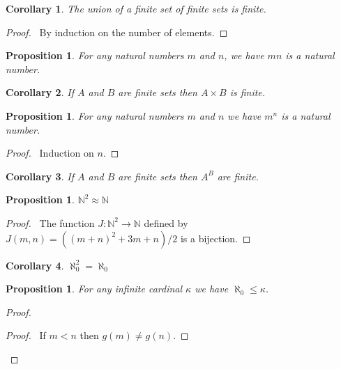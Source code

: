 \documentclass{book}
\let\qed\relax
\newtheorem{prop}[ax]{Proposition}
\newtheorem{cor}{Corollary}[ax]
\theoremstyle{definition}
\begin{document}
\begin{cor}
The union of a finite set of finite sets is finite.
\end{cor}

\begin{proof}
\pf\ By induction on the number of elements. \qed
\end{proof}

\begin{prop}
For any natural numbers $m$ and $n$, we have $mn$ is a natural number.
\end{prop}

\begin{cor}
If $A$ and $B$ are finite sets then $A \times B$ is finite.
\end{cor}

\begin{prop}
For any natural numbers $m$ and $n$ we have $m^n$ is a natural number.
\end{prop}

\begin{proof}
\pf\ Induction on $n$.
\end{proof}

\begin{cor}
If $A$ and $B$ are finite sets then $A^B$ are finite.
\end{cor}

\begin{prop}
$\mathbb{N}^2 \approx \mathbb{N}$
\end{prop}

\begin{proof}
\pf\ The function $J : \mathbb{N}^2 \rightarrow \mathbb{N}$ defined by $J(m,n) = ((m+n)^2 + 3m + n)/2$ is a bijection. \qed
\end{proof}

\begin{cor}
$\aleph_0^2 = \aleph_0$
\end{cor}

\begin{prop}
For any infinite cardinal $\kappa$ we have $\aleph_0 \leq \kappa$.
\end{prop}

\begin{proof}
\pf
{}
\begin{proof}
	\pf\ If $m < n$ then $g(m) \neq g(n)$.
\end{proof}
\qed
\end{proof}
\end{document}
